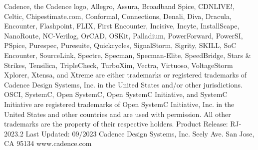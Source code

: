\documentclass[twoside]{book}
\newcommand{\+}{\discretionary{\mbox{\scriptsize$\hookleftarrow$}}{}{}}
\newcommand{\clearemptydoublepage}{%
  \newpage{\pagestyle{empty}\cleardoublepage}%
}
\begin{document}
\begin{titlepage}
{\vspace*{0.2cm}
\newline Cadence, the Cadence logo, Allegro, Assura, Broadband Spice, CDNLIVE!, Celtic, Chipestimate.com, Conformal, Connections, Denali, Diva, Dracula, Encounter, Flashpoint, FLIX, First Encounter, Incisive, Incyte, InstallScape, NanoRoute, NC-Verilog, OrCAD, OSKit, Palladium, PowerForward, PowerSI, PSpice, Purespec, Puresuite, Quickcycles, SignalStorm, Sigrity, SKILL, SoC Encounter, SourceLink, Spectre, Specman, Specman-Elite, SpeedBridge, Stars \& Strikes, Tensilica, TripleCheck, TurboXim, Vectra, Virtuoso, VoltageStorm Xplorer, Xtensa, and Xtreme are either trademarks or registered trademarks of Cadence Design Systems, Inc. in the United States and/or other jurisdictions. 
OSCI, SystemC, Open SystemC, Open SystemC Initiative, and SystemC Initiative are registered trademarks of Open SystemC Initiative, Inc. in the United States and other countries and are used with permission. All other trademarks are the property of their respective holders.
\vspace*{2.5cm}
\newline Product Release: RJ-2023.2
\newline Last Updated: 09/2023
\vspace*{0.4cm}
\newline
\vspace*{0.5cm}
\newline Cadence Design Systems, Inc.
 Seely Ave.
\newline San Jose, CA 95134
\newline www.cadence.com
}
\end{titlepage}
\clearemptydoublepage

{}
\tableofcontents
\clearemptydoublepage
{}
\listoftables
\clearemptydoublepage
{}
\listoffigures
\clearemptydoublepage

\hypersetup{pageanchor=true}

\end{document}
